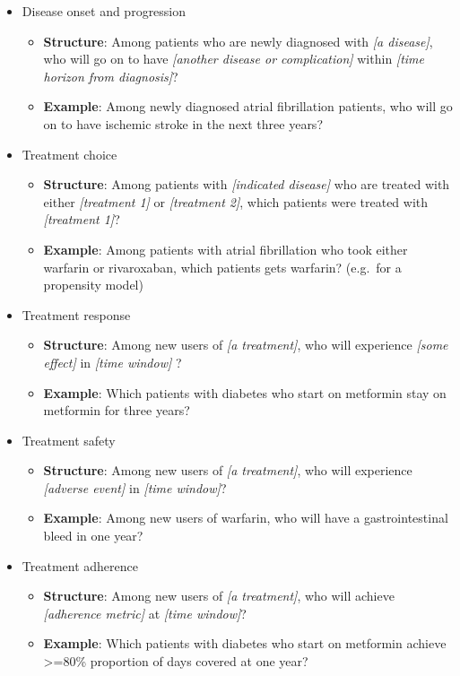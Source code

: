 \documentclass[11pt]{book}
\providecommand{\tightlist}{%
  \setlength{\itemsep}{0pt}\setlength{\parskip}{0pt}}
\theoremstyle{definition}
\theoremstyle{definition}
\theoremstyle{definition}
\theoremstyle{remark}
\begin{document}
\begin{itemize}
\tightlist
\item
  Disease onset and progression

  \begin{itemize}
  \tightlist
  \item
    \textbf{Structure}: Among patients who are newly diagnosed with \emph{{[}a disease{]}}, who will go on to have \emph{{[}another disease or complication{]}} within \emph{{[}time horizon from diagnosis{]}}?
  \item
    \textbf{Example}: Among newly diagnosed atrial fibrillation patients, who will go on to have ischemic stroke in the next three years?
  \end{itemize}
\item
  Treatment choice

  \begin{itemize}
  \tightlist
  \item
    \textbf{Structure}: Among patients with \emph{{[}indicated disease{]}} who are treated with either \emph{{[}treatment 1{]}} or \emph{{[}treatment 2{]}}, which patients were treated with \emph{{[}treatment 1{]}}?
  \item
    \textbf{Example}: Among patients with atrial fibrillation who took either warfarin or rivaroxaban, which patients gets warfarin? (e.g.~for a propensity model)
  \end{itemize}
\item
  Treatment response

  \begin{itemize}
  \tightlist
  \item
    \textbf{Structure}: Among new users of \emph{{[}a treatment{]}}, who will experience \emph{{[}some effect{]}} in \emph{{[}time window{]}} ?
  \item
    \textbf{Example}: Which patients with diabetes who start on metformin stay on metformin for three years?
  \end{itemize}
\item
  Treatment safety

  \begin{itemize}
  \tightlist
  \item
    \textbf{Structure}: Among new users of \emph{{[}a treatment{]}}, who will experience \emph{{[}adverse event{]}} in \emph{{[}time window{]}}?
  \item
    \textbf{Example}: Among new users of warfarin, who will have a gastrointestinal bleed in one year?
  \end{itemize}
\item
  Treatment adherence

  \begin{itemize}
  \tightlist
  \item
    \textbf{Structure}: Among new users of \emph{{[}a treatment{]}}, who will achieve \emph{{[}adherence metric{]}} at \emph{{[}time window{]}}?
  \item
    \textbf{Example}: Which patients with diabetes who start on metformin achieve \textgreater=80\% proportion of days covered at one year?
  \end{itemize}
\end{itemize}
\end{document}
